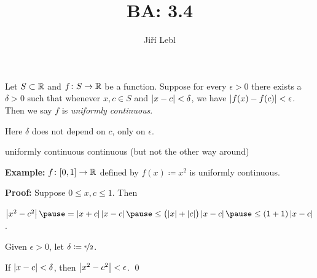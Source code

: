 \documentclass[10pt,aspectratio=169]{beamer}
\author{Ji\v{r}\'i Lebl}
\institute[OSU]{%
Departemento pri Matematiko de Oklahoma {\^S}tata Universitato}
\title{BA: 3.4}
\date{}
\begin{document}
\begin{frame}
\titlepage
\end{frame}

\begin{frame}
\begin{definition}
Let $S \subset {\mathbb{R}}$ and $f \colon S \to {\mathbb{R}}$ be a function.
Suppose for every $\epsilon > 0$ there exists a $\delta > 0$
such that whenever $x, c \in S$ and
$\left\lvert {x-c} \right\rvert < \delta$, we have $\left\lvert {f(x)-f(c)} \right\rvert < \epsilon$.
Then we say $f$ is \emph{uniformly continuous}.
\end{definition}

\pause
Here $\delta$ does not depend on $c$, only on $\epsilon$.

\pause
\medskip

uniformly continuous \wthus continuous \quad (but not the other way around)

\pause
\medskip

\textbf{Example:}
$f \colon [0,1] \to {\mathbb{R}}$ defined by $f(x) \coloneqq x^2$ is uniformly continuous.

\pause
\medskip

\textbf{Proof:}
Suppose $0 \leq x,c \leq 1$.  Then

\medskip

$\abs{x^2-c^2}
\pause
= \abs{x+c}\abs{x-c}
\pause
\leq \bigl(\abs{x}+\abs{c}\bigr) \abs{x-c}
\pause
\leq (1+1)\abs{x-c}$.

\medskip
\pause
Given $\epsilon > 0$, let $\delta \coloneqq \nicefrac{\epsilon}{2}$.

\pause
If $\left\lvert {x-c} \right\rvert < \delta$, then $\left\lvert {x^2-c^2} \right\rvert < \epsilon$.
\qed

\end{frame}
\end{document}
